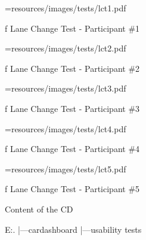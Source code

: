 \midinsert {}
\picw=\hsize \cinspic resources/images/tests/lct1.pdf
\caption/f Lane Change Test - Participant \#1
\endinsert

\midinsert {}
\picw=\hsize \cinspic resources/images/tests/lct2.pdf
\caption/f Lane Change Test - Participant \#2
\endinsert

\midinsert {}
\picw=\hsize \cinspic resources/images/tests/lct3.pdf
\caption/f Lane Change Test - Participant \#3
\endinsert

\midinsert {}
\picw=\hsize \cinspic resources/images/tests/lct4.pdf
\caption/f Lane Change Test - Participant \#4
\endinsert

\midinsert {}
\picw=\hsize \cinspic resources/images/tests/lct5.pdf
\caption/f Lane Change Test - Participant \#5
\endinsert


\nextoddpage

\app Content of the CD

\begtt

E:.
|---cardashboard
|---usability tests


\endtt




